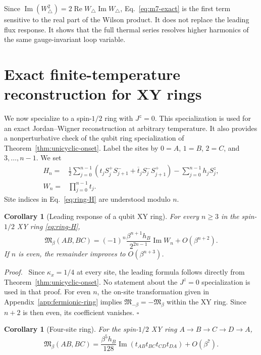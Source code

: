 \documentclass[11pt]{article}
\newcommand{\Mmod}{\mathfrak{M}}
\newtheorem{corollary}[theorem]{Corollary}
\newenvironment{proof}{\par\noindent\textit{Proof.}\ }%
{\unskip\nobreak\hfill\(\square\)\par}
\begin{document}
Since $\operatorname{Im}(W_\triangle^2)=2\operatorname{Re}W_\triangle
\operatorname{Im}W_\triangle$, Eq.~\eqref{eq:m7-exact} is the first term
sensitive to the real part of the Wilson product.  It does not replace the
leading flux response.  It shows that the full thermal series resolves higher
harmonics of the same gauge-invariant loop variable.

\section{Exact finite-temperature reconstruction for XY rings}
\label{sec:free-fermion-rings}

We now specialize to a spin-$1/2$ ring with $J^z=0$.  This specialization is
used for an exact Jordan--Wigner reconstruction at arbitrary temperature.  It
also provides a nonperturbative check of the qubit ring specialization of
Theorem~\ref{thm:unicyclic-onset}.  Label the sites by $0=A$, $1=B$, $2=C$,
and $3,\ldots,n-1$.  We set
\begin{align}
 H_n={}&\frac12\sum_{j=0}^{n-1}
 \left(t_jS_j^+S_{j+1}^-+\overline t_jS_j^-S_{j+1}^+\right)
 -\sum_{j=0}^{n-1}h_jS_j^z,
 \label{eq:ring-H}\\
 W_n={}&\prod_{j=0}^{n-1}t_j.
 \label{eq:Wn}
\end{align}
Site indices in Eq.~\eqref{eq:ring-H} are understood modulo $n$.

\begin{corollary}[Leading response of a qubit XY ring]
\label{thm:ring-law}
For every $n\ge3$ in the spin-$1/2$ XY ring \eqref{eq:ring-H},
\begin{equation}
 \boxed{
 \Mmod_\beta(AB,BC)
 =(-1)^n\frac{\beta^{n+1}h_B}{2^{2n-1}}
 \operatorname{Im}W_n+O(\beta^{n+2})}.
 \label{eq:ring-law}
\end{equation}
If $n$ is even, the remainder improves to $O(\beta^{n+3})$.
\end{corollary}

\begin{proof}
Since $\kappa_x=1/4$ at every site, the leading formula follows directly from
Theorem~\ref{thm:unicyclic-onset}.  No statement about the $J^z=0$
specialization is used in that proof.
For even $n$, the on-site transformation given in
Appendix~\ref{app:fermionic-ring} implies
$\Mmod_{-\beta}=-\Mmod_\beta$ within the XY ring.  Since
$n+2$ is then even, its coefficient vanishes.
\end{proof}

\begin{corollary}[Four-site ring]
\label{thm:square}
For the spin-$1/2$ XY ring $A\to B\to C\to D\to A$,
\begin{equation}
 \Mmod_\beta(AB,BC)
 =\frac{\beta^5h_B}{128}
 \operatorname{Im}(t_{AB}t_{BC}t_{CD}t_{DA})+O(\beta^7).
 \label{eq:square-main}
\end{equation}
\end{corollary}
\end{document}
